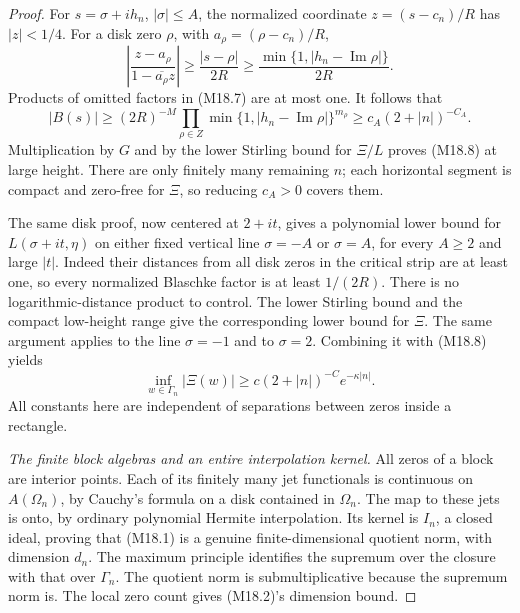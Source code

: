 \begin{proof}
For \(s=\sigma+i h_n\), \(|\sigma|\le A\), the normalized
coordinate \(z=(s-c_n)/R\) has \(|z|<1/4\).
For a disk zero \(\rho\), with \(a_\rho=(\rho-c_n)/R\),
\[
 \left|\frac{z-a_\rho}{1-\overline{a_\rho}z}\right|
    \ge\frac{|s-\rho|}{2R}
    \ge\frac{\min\{1,|h_n-\operatorname{Im}\rho|\}}{2R}.
\]
Products of omitted factors in (M18.7) are at most one.
It follows that
\[
 |B(s)|\ge(2R)^{-M}
   \prod_{\rho\in Z}
      \min\{1,|h_n-\operatorname{Im}\rho|\}^{m_\rho}
             \ge c_A(2+|n|)^{-C_A}.
\]
Multiplication by \(G\) and by the lower Stirling bound
for \(\Xi/L\) proves (M18.8) at large height.
There are only finitely many remaining \(n\); each
horizontal segment is compact and zero-free for \(\Xi\),
so reducing \(c_A>0\) covers them.

The same disk proof, now centered at \(2+it\), gives a
polynomial lower bound for \(L(\sigma+it,\eta)\) on either
fixed vertical line \(\sigma=-A\) or \(\sigma=A\), for
every \(A\ge2\) and large \(|t|\).  Indeed their distances
from all disk zeros in the critical strip are at least one,
so every normalized Blaschke factor is at least \(1/(2R)\).
There is no logarithmic-distance product to control.
The lower Stirling bound and the compact low-height range
give the corresponding lower bound for \(\Xi\).
The same argument applies to the line \(\sigma=-1\)
and to \(\sigma=2\).  Combining it with (M18.8) yields
\[
 \inf_{w\in\Gamma_n}|\Xi(w)|
       \ge c(2+|n|)^{-C}e^{-\kappa|n|}.                          \tag{M18.9}
\]
All constants here are independent of separations between
zeros inside a rectangle.

\emph{The finite block algebras and an entire interpolation kernel.}
All zeros of a block are interior points.  Each of its
finitely many jet functionals is continuous on
\(A(\Omega_n)\), by Cauchy's formula on a disk contained
in \(\Omega_n\).  The map to these jets is onto, by
ordinary polynomial Hermite interpolation.  Its kernel
is \(I_n\), a closed ideal, proving that (M18.1) is a
genuine finite-dimensional quotient norm, with dimension
\(d_n\).  The maximum principle identifies the supremum
over the closure with that over \(\Gamma_n\).
The quotient norm is submultiplicative because the
supremum norm is.  The local zero count gives (M18.2)'s
dimension bound.


\end{proof}
